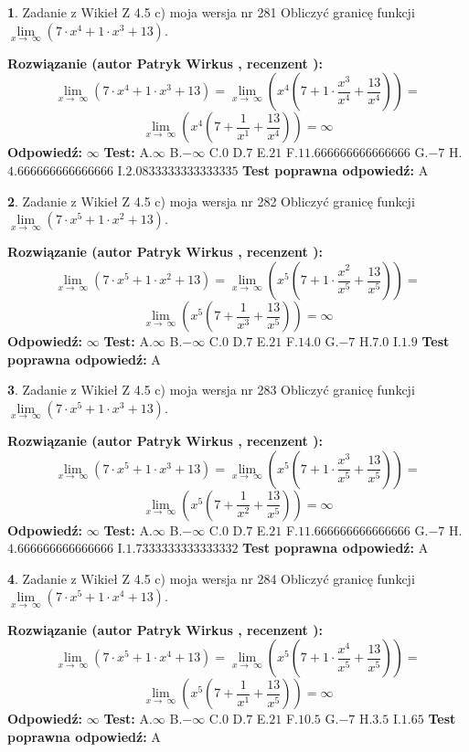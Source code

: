 \documentclass[12pt, a4paper]{article}
\theoremstyle{definition} %
\newtheorem{zad}{}
\newcommand{\zadStart}[1]{\begin{zad}#1\newline}
\newcommand{\zadStop}{\end{zad}}
\newcommand{\rozwStart}[2]{\noindent \textbf{Rozwiązanie (autor #1 , recenzent #2): }\newline}
\newcommand{\rozwStop}{\newline}
\newcommand{\odpStart}{\noindent \textbf{Odpowiedź:}\newline}
\newcommand{\odpStop}{\newline}
\newcommand{\testStart}{\noindent \textbf{Test:}\newline}
\newcommand{\testStop}{\newline}
\newcommand{\kluczStart}{\noindent \textbf{Test poprawna odpowiedź:}\newline}
\newcommand{\kluczStop}{\newline}
\begin{document}
\zadStart{Zadanie z Wikieł Z 4.5 c) moja wersja nr 281}
Obliczyć granicę funkcji  $\lim\limits_{x\to\ \infty}(7 \cdot x^{4}+1 \cdot x^{3}+13)$.
\zadStop
\rozwStart{Patryk Wirkus}{}
$$\lim\limits_{x\to\ \infty}(7 \cdot x^{4}+1 \cdot x^{3}+13) = \lim\limits_{x\to\ \infty}(x^{4}(7 +1 \cdot \frac{x^{3}}{x^{4}}+\frac{13}{x^{4}})) =$$ $$\lim\limits_{x\to\ \infty}(x^{4}(7 +\frac{1}{x^{1}}+\frac{13}{x^{4}})) =\infty$$
\rozwStop
\odpStart
$\infty$
\odpStop
\testStart
A.$\infty$ B.$-\infty$ C.$0$ D.$7$ E.$21$
F.$11.666666666666666$ G.$-7$
H.$4.666666666666666$
I.$2.0833333333333335$
\testStop
\kluczStart
A
\kluczStop



\zadStart{Zadanie z Wikieł Z 4.5 c) moja wersja nr 282}
Obliczyć granicę funkcji  $\lim\limits_{x\to\ \infty}(7 \cdot x^{5}+1 \cdot x^{2}+13)$.
\zadStop
\rozwStart{Patryk Wirkus}{}
$$\lim\limits_{x\to\ \infty}(7 \cdot x^{5}+1 \cdot x^{2}+13) = \lim\limits_{x\to\ \infty}(x^{5}(7 +1 \cdot \frac{x^{2}}{x^{5}}+\frac{13}{x^{5}})) =$$ $$\lim\limits_{x\to\ \infty}(x^{5}(7 +\frac{1}{x^{3}}+\frac{13}{x^{5}})) =\infty$$
\rozwStop
\odpStart
$\infty$
\odpStop
\testStart
A.$\infty$ B.$-\infty$ C.$0$ D.$7$ E.$21$
F.$14.0$ G.$-7$
H.$7.0$
I.$1.9$
\testStop
\kluczStart
A
\kluczStop



\zadStart{Zadanie z Wikieł Z 4.5 c) moja wersja nr 283}
Obliczyć granicę funkcji  $\lim\limits_{x\to\ \infty}(7 \cdot x^{5}+1 \cdot x^{3}+13)$.
\zadStop
\rozwStart{Patryk Wirkus}{}
$$\lim\limits_{x\to\ \infty}(7 \cdot x^{5}+1 \cdot x^{3}+13) = \lim\limits_{x\to\ \infty}(x^{5}(7 +1 \cdot \frac{x^{3}}{x^{5}}+\frac{13}{x^{5}})) =$$ $$\lim\limits_{x\to\ \infty}(x^{5}(7 +\frac{1}{x^{2}}+\frac{13}{x^{5}})) =\infty$$
\rozwStop
\odpStart
$\infty$
\odpStop
\testStart
A.$\infty$ B.$-\infty$ C.$0$ D.$7$ E.$21$
F.$11.666666666666666$ G.$-7$
H.$4.666666666666666$
I.$1.7333333333333332$
\testStop
\kluczStart
A
\kluczStop



\zadStart{Zadanie z Wikieł Z 4.5 c) moja wersja nr 284}
Obliczyć granicę funkcji  $\lim\limits_{x\to\ \infty}(7 \cdot x^{5}+1 \cdot x^{4}+13)$.
\zadStop
\rozwStart{Patryk Wirkus}{}
$$\lim\limits_{x\to\ \infty}(7 \cdot x^{5}+1 \cdot x^{4}+13) = \lim\limits_{x\to\ \infty}(x^{5}(7 +1 \cdot \frac{x^{4}}{x^{5}}+\frac{13}{x^{5}})) =$$ $$\lim\limits_{x\to\ \infty}(x^{5}(7 +\frac{1}{x^{1}}+\frac{13}{x^{5}})) =\infty$$
\rozwStop
\odpStart
$\infty$
\odpStop
\testStart
A.$\infty$ B.$-\infty$ C.$0$ D.$7$ E.$21$
F.$10.5$ G.$-7$
H.$3.5$
I.$1.65$
\testStop
\kluczStart
A
\kluczStop
\end{document}
